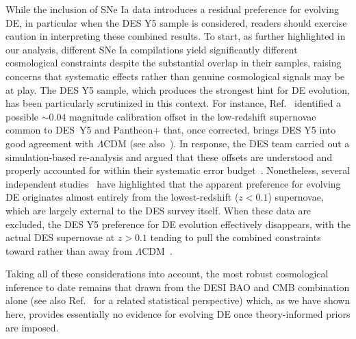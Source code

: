 While the inclusion of SNe Ia data introduces a residual preference for evolving DE, in particular when the DES Y5 sample is considered, readers should exercise caution in interpreting these combined results. To start, as further highlighted in our analysis, different SNe Ia compilations yield significantly different cosmological constraints despite the substantial overlap in their samples, raising concerns that systematic effects rather than genuine cosmological signals may be at play.  The DES Y5 sample, which produces the strongest hint for DE evolution, has been particularly scrutinized in this context. For instance, Ref.~\cite{Efstathiou:2024xcq} identified a possible $\sim 0.04$ magnitude calibration offset in the low-redshift supernovae common to DES~Y5 and Pantheon+ that, once corrected, brings DES Y5 into good agreement with $\Lambda$CDM (see also~\cite{Huang:2025som}). In response, the DES team carried out a simulation-based re-analysis and argued that these offsets are understood and properly accounted for within their systematic error budget~\cite{DES:2025tir}. Nonetheless, several independent studies~\cite{Gialamas:2024lyw, Notari:2024zmi,DESI:2025zgx,Wang:2025bkk,Huang:2025som, Afroz:2025iwo,  Teixeira:2025czm,Chaudhary:2025vzy} have highlighted that the apparent preference for evolving DE originates almost entirely from the lowest-redshift ($z<0.1$) supernovae, which are largely external to the DES survey itself. When these data are excluded, the DES Y5 preference for DE evolution effectively disappears, with the actual DES supernovae at $z>0.1$ tending to pull the combined constraints toward rather than away from $\Lambda$CDM~\cite{Gialamas:2024lyw, Notari:2024zmi, Wang:2025bkk,Huang:2025som, Chaudhary:2025vzy, Guedezounme:2025wav}.

Taking all of these considerations into account, the most robust cosmological inference to date remains  that drawn from the DESI BAO and CMB combination alone (see also Ref.~\cite{Cortes:2025joz} for a related statistical perspective) which, as we have shown here, provides essentially no evidence for evolving DE once theory-informed priors are imposed.

